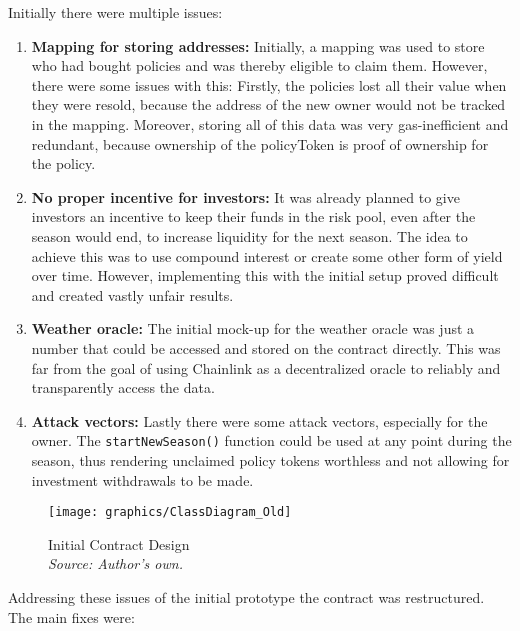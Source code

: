 \documentclass[11pt,a4paper]{article}
\begin{document}
		Initially there were multiple issues:
		\begin{enumerate}[1]
		\item \textbf{Mapping for storing addresses:} Initially, a mapping was used to store who had bought policies and was thereby eligible to claim them.
		However, there were some issues with this: Firstly, the policies lost all their value when they were resold, because the address of the new owner would not be tracked in the mapping.
		Moreover, storing all of this data was very gas-inefficient and redundant, because ownership of the policyToken is proof of ownership for the policy.
		\item \textbf{No proper incentive for investors:} It was already planned to give investors an incentive to keep their funds in the risk pool, even after the season would end, to increase liquidity for the next season.
		The idea to achieve this was to use compound interest or create some other form of yield over time.
		However, implementing this with the initial setup proved difficult and created vastly unfair results.
		\item \textbf{Weather oracle:} The initial mock-up for the weather oracle was just a number that could be accessed and stored on the contract directly.
		This was far from the goal of using Chainlink as a decentralized oracle to reliably and transparently access the data.
		\item \textbf{Attack vectors:} Lastly there were some attack vectors, especially for the owner.
		The \texttt{startNewSeason()} function could be used at any point during the season, thus rendering unclaimed policy tokens worthless and not allowing for investment withdrawals to be made.
		\end{enumerate}

		\begin{figure}[htbp]
			\centering
			\texttt{[image: graphics/ClassDiagram\_Old]}
			\caption{Initial Contract Design \\ \textit{Source: Author's own.}}
			\label{fig:initial-contract-design}
		\end{figure}

		Addressing these issues of the initial prototype the contract was restructured.
		The main fixes were:
\end{document}
